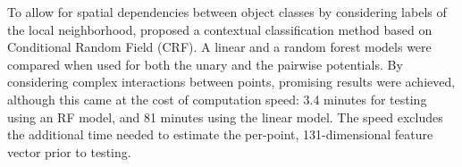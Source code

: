 \documentclass[final,3p,times,twocolumn,authoryear]{elsarticle}
\newcommand{\mxy}[1]{ \color{red}{#1}}
\begin{document}
To allow for spatial dependencies between object classes by considering labels of the local neighborhood, \citet{NIEMEYER2014152} proposed a contextual classification method based on Conditional Random Field (CRF). A linear and a random forest models were compared when used for both the unary and the pairwise potentials.
By considering complex interactions between points, promising results were achieved, although this came at the cost of computation speed: 3.4 minutes for testing using an RF model, and 81 minutes using the linear model. 
The speed excludes the additional time needed to estimate the per-point, 131-dimensional feature vector prior to testing.
 
\end{document}
